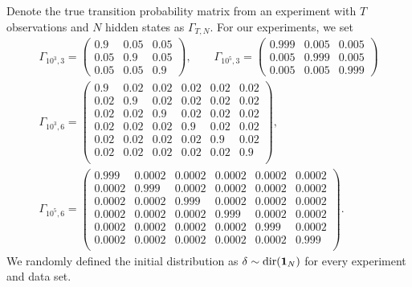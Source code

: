 Denote the true transition probability matrix from an experiment with $T$ observations and $N$ hidden states as $\Gamma_{T,N}$. For our experiments, we set
%
\begin{gather*}
    \Gamma_{10^3,3} = 
    \begin{pmatrix} 
        0.9 & 0.05 & 0.05 \\
        0.05 & 0.9 & 0.05 \\
        0.05 & 0.05 & 0.9
    \end{pmatrix},
    \qquad
    \Gamma_{10^5,3} = 
    \begin{pmatrix} 
        0.999 & 0.005 & 0.005 \\
        0.005 & 0.999 & 0.005 \\
        0.005 & 0.005 & 0.999
    \end{pmatrix}
    \\
    \Gamma_{10^3,6} = 
    \begin{pmatrix} 
        0.9  & 0.02 & 0.02 & 0.02 & 0.02 & 0.02 \\
        0.02 & 0.9  & 0.02 & 0.02 & 0.02 & 0.02 \\
        0.02 & 0.02 & 0.9  & 0.02 & 0.02 & 0.02 \\
        0.02 & 0.02 & 0.02 & 0.9  & 0.02 & 0.02 \\
        0.02 & 0.02 & 0.02 & 0.02 & 0.9  & 0.02 \\
        0.02 & 0.02 & 0.02 & 0.02 & 0.02 & 0.9  \\
    \end{pmatrix},
    \\
    \Gamma_{10^5,6} = 
    \begin{pmatrix} 
        0.999  & 0.0002 & 0.0002 & 0.0002 & 0.0002 & 0.0002 \\
        0.0002 & 0.999  & 0.0002 & 0.0002 & 0.0002 & 0.0002 \\
        0.0002 & 0.0002 & 0.999  & 0.0002 & 0.0002 & 0.0002 \\
        0.0002 & 0.0002 & 0.0002 & 0.999  & 0.0002 & 0.0002 \\
        0.0002 & 0.0002 & 0.0002 & 0.0002 & 0.999  & 0.0002 \\
        0.0002 & 0.0002 & 0.0002 & 0.0002 & 0.0002 & 0.999  \\
    \end{pmatrix}.
\end{gather*}
%
We randomly defined the initial distribution as $\delta \sim \text{dir}(\mathbf{1}_N)$ for every experiment and data set.


